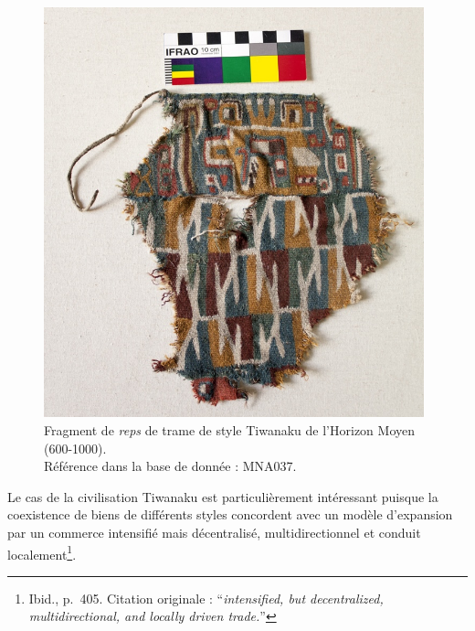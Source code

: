 \begin{figure}[!ht]
       \begin{center}
        		\includegraphics[width=11cm]{../images/MNA037_IMG_2829.jpg}
	\end{center}
    \caption{Fragment de \textit{reps} de trame de style Tiwanaku de l'Horizon Moyen (600-1000). \\ Référence dans la base de donnée : MNA037.}     
    \label{fig:MNA037}
\end{figure}

Le cas de la civilisation Tiwanaku est particulièrement intéressant puisque la coexistence de biens de différents styles concordent avec un modèle d'expansion par  \og un commerce intensifié mais décentralisé, multidirectionnel et conduit localement\fg \footnote{Ibid., p.~405. Citation originale : \textquotedblleft  \textit{intensified, but decentralized, multidirectional, and locally driven trade.}\textquotedblright}. 

